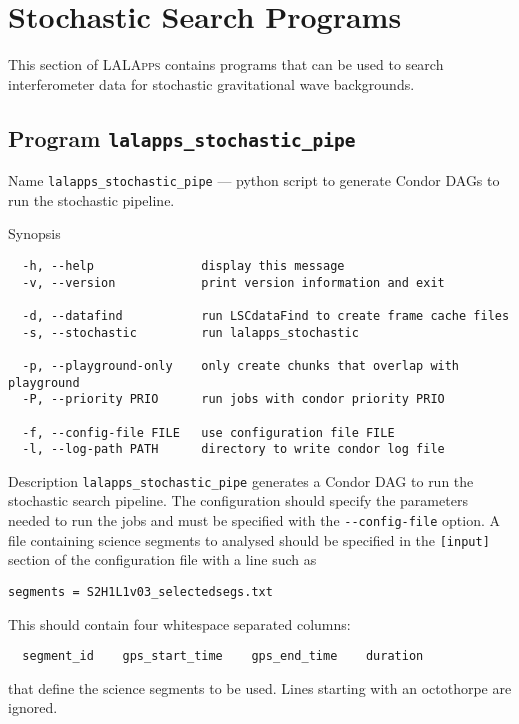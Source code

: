 \section{Stochastic Search Programs}
\label{section:stochastic}

This section of \textsc{LALApps} contains programs that can be used to
search interferometer data for stochastic gravitational wave
backgrounds.

\clearpage


\clearpage
\subsection{Program \texttt{lalapps\_stochastic\_pipe}}
\label{program:stochastic-pipeline}

\begin{entry}
\item[Name]
\verb$lalapps_stochastic_pipe$ --- python script to generate Condor DAGs
to run the stochastic pipeline.

\item[Synopsis]
\begin{verbatim}
  -h, --help               display this message
  -v, --version            print version information and exit

  -d, --datafind           run LSCdataFind to create frame cache files
  -s, --stochastic         run lalapps_stochastic

  -p, --playground-only    only create chunks that overlap with playground
  -P, --priority PRIO      run jobs with condor priority PRIO

  -f, --config-file FILE   use configuration file FILE
  -l, --log-path PATH      directory to write condor log file
\end{verbatim}

\item[Description] \verb$lalapps_stochastic_pipe$ generates a Condor DAG
to run the stochastic search pipeline. The configuration should specify
the parameters needed to run the jobs and must be specified with the
\verb$--config-file$ option. A file containing science segments to
analysed should be specified in the \verb$[input]$ section of the
configuration file with a line such as
\begin{verbatim}
segments = S2H1L1v03_selectedsegs.txt
\end{verbatim}
This should contain four whitespace separated columns:
\begin{verbatim}
  segment_id    gps_start_time    gps_end_time    duration
\end{verbatim}
that define the science segments to be used. Lines starting with an
octothorpe are ignored.


\end{entry}
